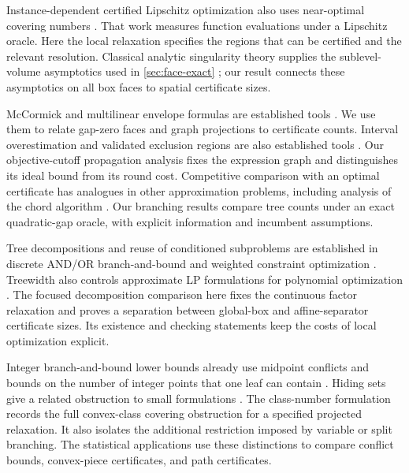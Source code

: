 Instance-dependent certified Lipschitz optimization also uses near-optimal
covering numbers
\citep{bachocCesariGerchinovitz2021LipschitzCertificates}.
That work measures function evaluations under a Lipschitz oracle. Here the
local relaxation specifies the regions that can be certified and the
relevant resolution. Classical analytic singularity theory supplies the
sublevel-volume asymptotics used in \cref{sec:face-exact}
\citep{lin2017LearningCoefficient}; our result connects these asymptotics on
all box faces to spatial certificate sizes.

McCormick and multilinear envelope formulas are established tools
\citep{mccormick1976Computability,rikun1997MultilinearEnvelope}.
We use them to relate gap-zero faces and graph projections to certificate
counts. Interval overestimation and validated exclusion regions are also
established tools
\citep{schichlMarkotNeumaier2014ExclusionRegions}. Our objective-cutoff
propagation analysis fixes the expression graph and distinguishes its ideal
bound from its round cost. Competitive comparison with an optimal certificate has analogues in
other approximation problems, including analysis of the chord algorithm
\citep{daskalakisDiakonikolasYannakakis2016ChordAlgorithm}. Our branching
results compare tree counts under an exact quadratic-gap oracle, with
explicit information and incumbent assumptions.

Tree decompositions and reuse of conditioned subproblems are established
in discrete AND/OR branch-and-bound and weighted constraint optimization
\citep{marinescuDechter2009AndOrBranchAndBound,deGivrySchiexVerfaillie2006TreeDecomposition}.
Treewidth also controls approximate LP formulations for polynomial
optimization \citep{bienstockMunoz2018LpFormulations}. The focused
decomposition comparison here fixes the continuous factor relaxation and
proves a separation between global-box and affine-separator certificate
sizes. Its existence and checking statements keep the costs of local
optimization explicit.

Integer branch-and-bound lower bounds already use midpoint conflicts and
bounds on the number of integer points that one leaf can contain
\citep{deyDubeyMolinaro2023BranchAndBoundLowerBounds}. Hiding sets give a
related obstruction to small formulations
\citep{kaibelWeltge2015LowerBoundsBranchAndBound}.
The class-number formulation records the full convex-class covering
obstruction for a specified projected relaxation. It also isolates the
additional restriction imposed by variable or split branching. The
statistical applications use these distinctions to compare conflict bounds,
convex-piece certificates, and path certificates.

